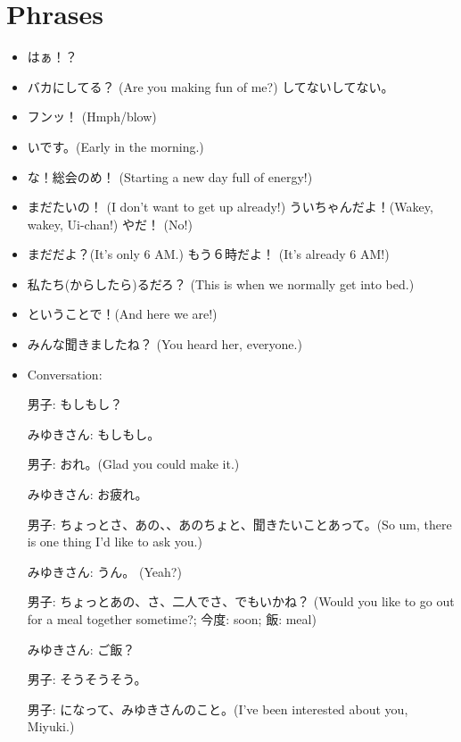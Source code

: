 \documentclass[../nihongo-gakushuu-kyouzai.tex]{subfiles}
\begin{document}
\section{Phrases}
\begin{itemize}
    \item はぁ！？
    \item バカにしてる？ (Are you making fun of me?) してないしてない。
    \item フンッ！ (Hmph/blow)
    \item {}いです。(Early in the morning.)
    \item {}な！総会のめ！ (Starting a new day full of energy!)
    \item まだたいの！ (I don't want to get up already!) ういちゃんだよ！(Wakey, wakey, Ui-chan!) やだ！ (No!)
    \item まだだよ？(It's only 6 AM.) もう６時だよ！ (It's already 6 AM!)
    \item 私たち(からしたら)るだろ？ (This is when we normally get into bed.)
    \item ということで！(And here we are!)
    \item みんな聞きましたね？ (You heard her, everyone.)

    \item Conversation: %

    男子: もしもし？

    みゆきさん: もしもし。

    男子: おれ。(Glad you could make it.)

    みゆきさん: お疲れ。

    男子: ちょっとさ、あの、、あのちょと、聞きたいことあって。(So um, there is one thing I'd like to ask you.)

    みゆきさん: うん。 (Yeah?)

    男子: ちょっとあの、さ、二人でさ、でもいかね？ (Would you like to go out for a meal together sometime?; 今度: soon; 飯: meal)

    みゆきさん: ご飯？

    男子: そうそうそう。

    男子: になって、みゆきさんのこと。(I've been interested about you, Miyuki.)


\end{itemize}
\end{document}
